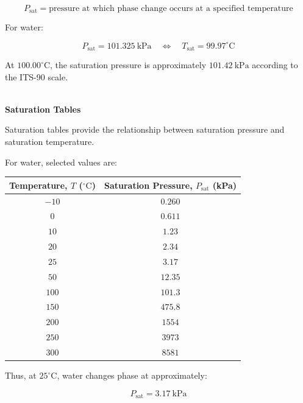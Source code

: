 \documentclass[12pt]{article}
\begin{document}
\begin{equation*}
\boxed{P_{\mathrm{sat}}=\text{pressure at which phase change occurs at a specified temperature}}
\end{equation*}

For water:

\begin{equation*}
P_{\mathrm{sat}}=101.325~\mathrm{kPa}
\quad\Longleftrightarrow\quad
T_{\mathrm{sat}}=99.97^\circ\mathrm{C}
\end{equation*}

At $100.00^\circ\mathrm{C}$, the saturation pressure is approximately $101.42~\mathrm{kPa}$ according to the ITS-90 scale.

\textbf{\\ Saturation Tables}

Saturation tables provide the relationship between saturation pressure and saturation temperature.

For water, selected values are:

\begin{center}
    \begin{tabular}{|c|c|}
        \hline
        \textbf{Temperature, $T$ ($^\circ\mathrm{C}$)} & \textbf{Saturation Pressure, $P_{\mathrm{sat}}$ (kPa)} \\
        \hline
        $-10$ & $0.260$ \\
        \hline
        $0$ & $0.611$ \\
        \hline
        $10$ & $1.23$ \\
        \hline
        $20$ & $2.34$ \\
        \hline
        $25$ & $3.17$ \\
        \hline
        $50$ & $12.35$ \\
        \hline
        $100$ & $101.3$ \\
        \hline
        $150$ & $475.8$ \\
        \hline
        $200$ & $1554$ \\
        \hline
        $250$ & $3973$ \\
        \hline
        $300$ & $8581$ \\
        \hline
    \end{tabular}
\end{center}

Thus, at $25^\circ\mathrm{C}$, water changes phase at approximately:

\begin{equation*}
P_{\mathrm{sat}}=3.17~\mathrm{kPa}
\end{equation*}
\end{document}
